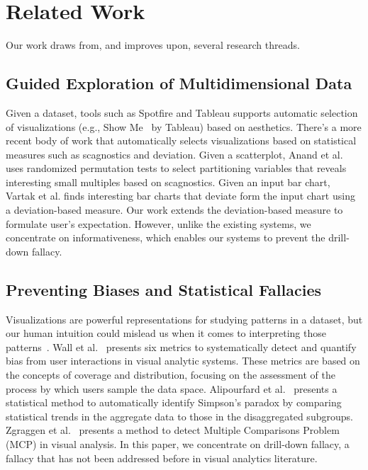 \section{Related Work}
Our work draws from, and improves upon, several research threads.

\subsection{Guided Exploration of Multidimensional Data}
Given a dataset, tools such as Spotfire and Tableau supports automatic selection of visualizations (e.g., Show Me~\cite{Mackinlay2007} by Tableau) based on aesthetics. There's a more recent body of work that automatically selects visualizations based on statistical measures such as scagnostics and deviation. Given a scatterplot, Anand et al. \cite{Anand2015} uses randomized permutation tests to select partitioning variables that reveals interesting small multiples based on scagnostics. Given an input bar chart, Vartak et al. \cite{Vartak2015} finds interesting bar charts that deviate form the input chart using a deviation-based measure. Our work extends the deviation-based measure to formulate user's expectation. However, unlike the existing systems, we concentrate on informativeness, which enables our systems to prevent the drill-down fallacy.

\subsection{Preventing Biases and Statistical Fallacies}
Visualizations are powerful representations for studying patterns in a dataset, but our human intuition could mislead us when it comes to interpreting those patterns~\cite{Wall2017, Alipourfard2018WSDM, Zgraggen2018CHI}. Wall et al.~\cite{Wall2017} presents six metrics to systematically detect and quantify bias from user interactions in visual analytic systems. These metrics are based on the concepts of coverage and distribution, focusing on the assessment of the process by which users sample the data space. Alipourfard et al.~\cite{Alipourfard2018WSDM} presents a statistical method to automatically identify Simpson’s paradox by comparing statistical trends in the aggregate data to those in the disaggregated subgroups. Zgraggen et al.~\cite{Zgraggen2018CHI} presents a method to detect Multiple Comparisons Problem (MCP) in visual analysis. In this paper, we concentrate on drill-down fallacy, a fallacy that has not been addressed before in visual analytics literature.

